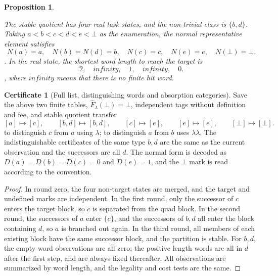 \documentclass[12pt,a4paper,openany,notitlepage]{report}
\theoremstyle{plain}
\newtheorem{proposition}[theorem]{Proposition}
\theoremstyle{definition}
\newtheorem*{certificate}{Certificate}
\theoremstyle{remark}
\def\infty{infinity}\def\Gamma{Gamma}\def\Phi{Phi}%
\begin{document}
\begin{CJK*}
\begin{proposition}
\begin{center}
\begin{tabular}
\bottomrule
\end{tabular}
\end{center}
The stable quotient has four real task states, and the non-trivial class is $\{b,d\}$. Taking $a<b<c<d<e<\bot$ as the enumeration, the normal representative element satisfies \[
 N(a)=a,\quad N(b)=N(d)=b,\quad N(c)=c,\quad N(e)=e,
 \quad N(\bot)=\bot.
\]. In the real state, the shortest word length to reach the target is \[
 2,\quad\infty,\quad1,\quad\infty,\quad0.
\], where $\infty$ means that there is no finite hit word.\end{proposition}
\begin{certificate}
[Full list, distinguishing words and absorption categories]Save the above two finite tables, $\widehat F_\lambda(\bot)=\bot$, independent tags without definition and fee, and stable quotient transfer \[
 [a]\mapsto[c],\qquad [b,d]\mapsto[b,d],\qquad
 [c]\mapsto[e],\qquad[e]\mapsto[e],\qquad[\bot]\mapsto[\bot].
\] to distinguish $c$ from $a$ using $\lambda$; to distinguish $a$ from $b$ uses $\lambda\lambda$. The indistinguishable certificates of the same type $b,d$ are the same as the current observation and the successors are all $d$. The normal form is decoded as $D(a)=D(b)=D(c)=0$ and $D(e)=1$, and the $\bot$ mark is read according to the convention.\end{certificate}
\begin{proof}
In round zero, the four non-target states are merged, and the target and undefined marks are independent. In the first round, only the successor of $c$ enters the target block, so $c$ is separated from the quad block. In the second round, the successors of $a$ enter $\{c\}$, and the successors of $b,d$ all enter the block containing $d$, so $a$ is branched out again. In the third round, all members of each existing block have the same successor block, and the partition is stable. For $b,d$, the empty word observations are all zero; the positive length words are all in $d$ after the first step, and are always fixed thereafter. All observations are summarized by word length, and the legality and cost tests are the same.


\end{proof}
\end{CJK*}
\end{document}
